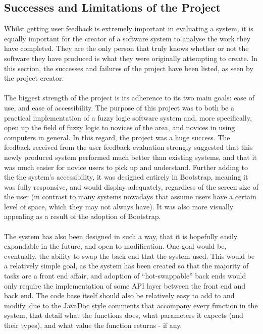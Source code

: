 \subsection{Successes and Limitations of the Project}
Whilst getting user feedback is extremely important in evaluating a system, it is equally important for the creator of a software system to analyse the work they have completed. They are the only person that truly knows whether or not the software they have produced is what they were originally attempting to create. In this section, the successes and failures of the project have been listed, as seen by the project creator.\ \\
\ \\
The biggest strength of the project is its adherence to its two main goals: ease of use, and ease of accessibility. The purpose of this project was to both be a practical implementation of a fuzzy logic software system and, more specifically, open up the field of fuzzy logic to novices of the area, and novices in using computers in general. In this regard, the project was a huge success. The feedback received from the user feedback evaluation strongly suggested that this newly produced system performed much better than existing systems, and that it was much easier for novice users to pick up and understand. Further adding to the the system's accessibility, it was designed entirely in Bootstrap, meaning it was fully responsive, and would display adequately, regardless of the screen size of the user (in contrast to many systems nowadays that assume users have a certain level of space, which they may not always have). It was also more visually appealing as a result of the adoption of Bootstrap.\ \\
\ \\
The system has also been designed in such a way, that it is hopefully easily expandable in the future, and open to modification. One goal would be, eventually, the ability to swap the back end that the system used. This would be a relatively simple goal, as the system has been created so that the majority of tasks are a front end affair, and adoption of ``hot-swappable'' back ends would only require the implementation of some API layer between the front end and back end. The code base itself should also be relatively easy to add to and modify, due to the JavaDoc style comments that accompany every function in the system, that detail what the functions does, what parameters it expects (and their types), and what value the function returns - if any.
\newpage 
\noindent 
